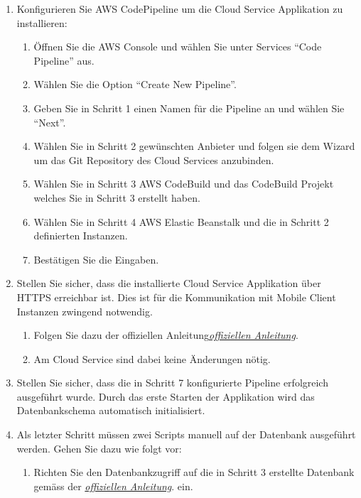 \begin{enumerate}
\begin{enumerate}
    \end{enumerate}
    \item Konfigurieren Sie AWS CodePipeline um die Cloud Service Applikation zu installieren:
    \begin{enumerate}
        \item Öffnen Sie die AWS Console und wählen Sie unter Services ``Code Pipeline'' aus.
        \item Wählen Sie die Option ``Create New Pipeline''.
        \item Geben Sie in Schritt 1 einen Namen für die Pipeline an und wählen Sie ``Next''.
        \item Wählen Sie in Schritt 2 gewünschten Anbieter und folgen sie dem Wizard um das Git Repository des Cloud Services anzubinden.
        \item Wählen Sie in Schritt 3 AWS CodeBuild und das CodeBuild Projekt welches Sie in Schritt 3 erstellt haben.
        \item Wählen Sie in Schritt 4 AWS Elastic Beanstalk und die in Schritt 2 definierten Instanzen.
        \item Bestätigen Sie die Eingaben.
    \end{enumerate}
    \item Stellen Sie sicher, dass die installierte Cloud Service Applikation über HTTPS erreichbar ist. Dies ist für die Kommunikation mit Mobile Client Instanzen zwingend notwendig.
    \begin{enumerate}
        \item Folgen Sie dazu der offiziellen Anleitung\href{https://aws.amazon.com/premiumsupport/knowledge-center/elastic-beanstalk-https-configuration/}{\textit{offiziellen Anleitung}}\cite{aws-elastic-https}.
        \item Am Cloud Service sind dabei keine Änderungen nötig.
    \end{enumerate}
    \item Stellen Sie sicher, dass die in Schritt 7 konfigurierte Pipeline erfolgreich ausgeführt wurde.
    Durch das erste Starten der Applikation wird das Datenbankschema automatisch initialisiert.
    \item Als letzter Schritt müssen zwei Scripts manuell auf der Datenbank ausgeführt werden.
    Gehen Sie dazu wie folgt vor:
    \begin{enumerate}
        \item Richten Sie den Datenbankzugriff auf die in Schritt 3 erstellte Datenbank gemäss der \href{https://docs.aws.amazon.com/AmazonRDS/latest/UserGuide/USER_ConnectToPostgreSQLInstance.html}{\textit{offiziellen Anleitung}}\cite{aws-elastic-rds-access}. ein.

\end{enumerate}
\end{enumerate}
